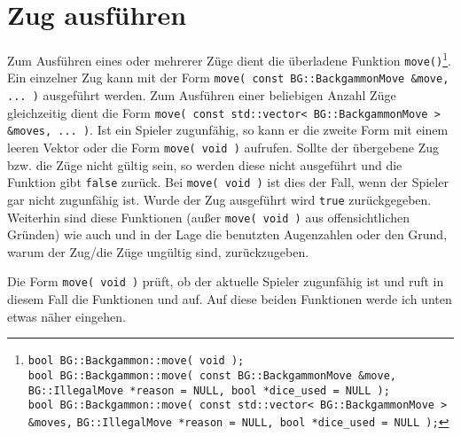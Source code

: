 {\section{Zug ausführen}
Zum Ausführen eines oder mehrerer Züge dient die überladene Funktion %
\lstinline$move()$\footnote{\lstinline$bool BG::Backgammon::move( void );$ \\ \lstinline$bool BG::Backgammon::move( const BG::BackgammonMove &move,$ \lstinline$BG::IllegalMove *reason = NULL, bool *dice_used = NULL );$ \\ \lstinline$bool BG::Backgammon::move( const std::vector< BG::BackgammonMove > &moves,$ \lstinline$BG::IllegalMove *reason = NULL, bool *dice_used = NULL );$ }.
Ein einzelner Zug kann mit der Form \lstinline$move( const BG::BackgammonMove &move, ... )$ ausgeführt werden. Zum Ausführen einer beliebigen Anzahl Züge gleichzeitig dient die Form \lstinline$move( const std::vector< BG::BackgammonMove > &moves, ... )$. Ist ein Spieler zugunfähig, so kann er die zweite Form mit einem leeren Vektor oder die Form \lstinline$move( void )$ aufrufen. Sollte der übergebene Zug bzw. die Züge nicht gültig sein, so werden diese nicht ausgeführt und die Funktion gibt \lstinline$false$ zurück. Bei \lstinline$move( void )$ ist dies der Fall, wenn der Spieler gar nicht zugunfähig ist. Wurde der Zug ausgeführt wird \lstinline$true$ zurückgegeben. Weiterhin sind diese Funktionen (außer \lstinline$move( void )$ aus offensichtlichen Gründen) wie auch
und
in der Lage die benutzten Augenzahlen oder den Grund, warum der Zug/die Züge ungültig sind, zurückzugeben.

Die Form \lstinline$move( void )$ prüft, ob der aktuelle Spieler zugunfähig ist und ruft in diesem Fall die Funktionen  und  auf. Auf diese beiden Funktionen werde ich unten etwas näher eingehen.

}
